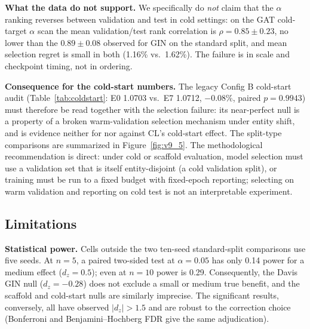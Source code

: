 \documentclass[10pt,a4paper,twocolumn]{article}
\begin{document}
\textbf{What the data do not support.} We specifically do \emph{not} claim that the $\alpha$ ranking reverses between validation and test in cold settings: on the GAT cold-target $\alpha$ scan the mean validation/test rank correlation is $\rho=0.85\pm0.23$, no lower than the $0.89\pm0.08$ observed for GIN on the standard split, and mean selection regret is small in both (1.16\% vs.\ 1.62\%). The failure is in scale and checkpoint timing, not in ordering.

\textbf{Consequence for the cold-start numbers.} The legacy Config B cold-start audit (Table~\ref{tab:coldstart}: E0 1.0703 vs.\ E7 1.0712, $-$0.08\%, paired $p=0.9943$) must therefore be read together with the selection failure: its near-perfect null is a property of a broken warm-validation selection mechanism under entity shift, and is evidence neither for nor against CL's cold-start effect. The split-type comparisons are summarized in Figure~\ref{fig:v9_5}. The methodological recommendation is direct: under cold or scaffold evaluation, model selection must use a validation set that is itself entity-disjoint (a cold validation split), or training must be run to a fixed budget with fixed-epoch reporting; selecting on warm validation and reporting on cold test is not an interpretable experiment.

\subsection{Limitations}

\textbf{Statistical power.} Cells outside the two ten-seed standard-split comparisons use five seeds. At $n=5$, a paired two-sided test at $\alpha=0.05$ has only 0.14 power for a medium effect ($d_z=0.5$); even at $n=10$ power is 0.29. Consequently, the Davis GIN null ($d_z=-0.28$) does not exclude a small or medium true benefit, and the scaffold and cold-start nulls are similarly imprecise. The significant results, conversely, all have observed $|d_z|>1.5$ and are robust to the correction choice (Bonferroni and Benjamini--Hochberg FDR give the same adjudication).
\end{document}
